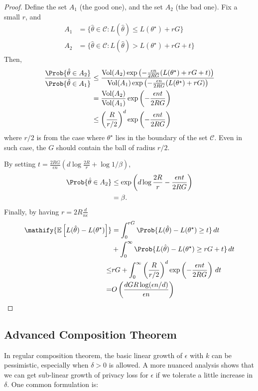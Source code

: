 \documentclass[11pt, a4paper]{article}
\newcommand{\E}[1]{\mathify{\mathbb{E}\left[#1\right]}}
\begin{document}
\begin{proof}
    Define the set $A_1$ (the good one), and the set $A_2$ (the bad one).
    Fix a small $r$, and
    \begin{align}
        A_1 &= \{\hat{\theta}\in \mathcal{C} : L(\hat{\theta}) \leq L(\theta^\star) + rG\}\\
        A_2 &= \{\hat{\theta}\in \mathcal{C} : L(\hat{\theta}) > L(\theta^\star) + rG + t\}
    \end{align}
    Then,
    \begin{align}
        \frac{\Prob{\hat{\theta}\in A_2}}{\Prob{\hat{\theta}\in A_1}}
        &\leq \frac{\mbox{Vol}(A_2)\exp{\left(-\frac{\epsilon n}{2RG} (L(\theta^\star) + rG+t)\right)}}
        {\mbox{Vol}(A_1)\exp{\left(-\frac{\epsilon n}{2RG} (L(\theta^\star) + rG)\right)}}\\
        &=\frac{\mbox{Vol}(A_2)}{\mbox{Vol}(A_1)}\exp{\left(-\frac{\epsilon nt}{2RG}\right)}\\
        &\leq \left(\frac{R}{r/2}\right)^d\exp{\left(-\frac{\epsilon nt}{2RG}\right)}
    \end{align}
    where $r/2$ is from the case where $\theta^\star$ lies in the boundary of the set $\mathcal{C}$.
    Even in such case, the $G$ should contain the ball of radius $r/2$.

    By setting $t= \frac{2RG}{\epsilon n} ( d\log \frac{2R}{r} + \log 1/\beta)$,
    \begin{align}
        \Prob{\hat{\theta}\in A_2}
        &\leq \exp{\left(d \log \frac{2R}{r}-\frac{\epsilon nt}{2RG}\right)}\\
        &= \beta.
    \end{align}
    Finally, by having $r = 2R \frac{d}{n\epsilon}$
    \begin{align}
        \E{L(\hat{\theta}) - L(\theta^\star)} &= \int_0^{rG} \Prob{L(\hat{\theta}) - L(\theta^\star)\geq t }\, dt \nonumber\\
        &+ \int_{0}^{\infty} \Prob{L(\hat{\theta}) - L(\theta^\star)\geq rG+t }\, dt \\
        \leq& rG +  \int_{0}^{\infty} \left(\frac{R}{r/2}\right)^d\exp\left(-\frac{\epsilon nt}{2RG}\right)\, dt \\
        =&    O\left(\frac{dGR\log(\epsilon n/d)}{\epsilon n}\right)
    \end{align}
\end{proof}

\subsection{Advanced Composition Theorem}
In regular composition theorem, the basic linear growth of $\epsilon$ with $k$ can be pessimistic,
especially when $\delta > 0$ is allowed.
A more nuanced analysis shows that we can get sub-linear growth of privacy loss for $\epsilon$ 
if we tolerate a little increase in $\delta$. One common formulation is:
\end{document}
